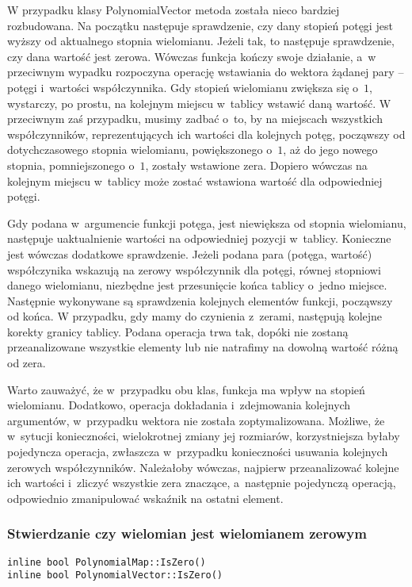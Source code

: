 W przypadku klasy PolynomialVector metoda została nieco bardziej rozbudowana. Na początku następuje sprawdzenie, czy dany stopień potęgi jest wyższy od aktualnego stopnia wielomianu. Jeżeli tak, to następuje sprawdzenie, czy dana wartość jest zerowa. Wówczas funkcja kończy swoje działanie, a~w przeciwnym wypadku rozpoczyna operację wstawiania do wektora żądanej pary – potęgi i~wartości współczynnika. Gdy stopień wielomianu zwiększa się o~$1$, wystarczy, po prostu, na kolejnym miejscu w~tablicy wstawić daną wartość. W przeciwnym zaś przypadku, musimy zadbać o~to, by na miejscach wszystkich współczynników, reprezentujących ich wartości dla kolejnych potęg, począwszy od dotychczasowego stopnia wielomianu, powiększonego o~$1$, aż do jego nowego stopnia, pomniejszonego o~$1$, zostały wstawione zera. Dopiero wówczas na kolejnym miejscu w~tablicy może zostać wstawiona wartość dla odpowiedniej potęgi.

Gdy podana w~argumencie funkcji potęga, jest niewiększa od stopnia wielomianu, następuje uaktualnienie wartości na odpowiedniej pozycji w~tablicy. Konieczne jest wówczas dodatkowe sprawdzenie. Jeżeli podana para (potęga, wartość) współczynika wskazują na zerowy współczynnik dla potęgi, równej stopniowi danego wielomianu, niezbędne jest przesunięcie końca tablicy o~jedno miejsce. Następnie wykonywane są sprawdzenia kolejnych elementów funkcji, począwszy od końca. W przypadku, gdy mamy do czynienia z~zerami, następują kolejne korekty granicy tablicy. Podana operacja trwa tak, dopóki nie zostaną przeanalizowane wszystkie elementy lub nie natrafimy na dowolną wartość różną od zera.

Warto zauważyć, że w~przypadku obu klas, funkcja ma wpływ na stopień wielomianu. Dodatkowo, operacja dokładania i~zdejmowania kolejnych argumentów, w~przypadku wektora nie została zoptymalizowana. Możliwe, że w~sytucji konieczności, wielokrotnej zmiany jej rozmiarów, korzystniejsza byłaby pojedyncza operacja, zwłaszcza w~przypadku konieczności usuwania kolejnych zerowych współczynników. Należałoby wówczas, najpierw przeanalizować kolejne ich wartości i~zliczyć wszystkie zera znaczące, a~następnie pojedynczą operacją, odpowiednio zmanipulować wskaźnik na ostatni element.

\subsubsection{Stwierdzanie czy wielomian jest wielomianem zerowym}
\begin{lstlisting}
inline bool PolynomialMap::IsZero()
inline bool PolynomialVector::IsZero()
\end{lstlisting}

